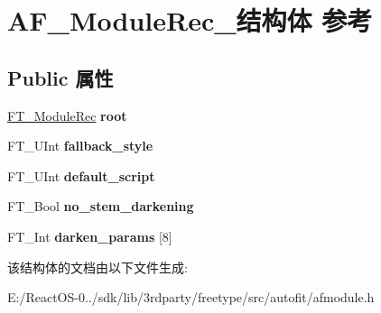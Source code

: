 \hypertarget{struct_a_f___module_rec__}{}\section{A\+F\+\_\+\+Module\+Rec\+\_\+结构体 参考}
\label{struct_a_f___module_rec__}
\subsection*{Public 属性}
\begin{DoxyCompactItemize}
\item 
\mbox{\label{struct_a_f___module_rec___a8e8fd4738d1c42e0610fac336bbc6d73}} 
\hyperlink{struct_f_t___module_rec__}{F\+T\+\_\+\+Module\+Rec} {\bfseries root}
\item 
\mbox{\label{struct_a_f___module_rec___a6960fca0f50a7d1ff28cb17d2be8aa66}} 
F\+T\+\_\+\+U\+Int {\bfseries fallback\+\_\+style}
\item 
\mbox{\label{struct_a_f___module_rec___a49c8dee7a9ef1ccd9f608028efab3ddc}} 
F\+T\+\_\+\+U\+Int {\bfseries default\+\_\+script}
\item 
\mbox{\label{struct_a_f___module_rec___ad6d5e179e222b6d4cb91038da82081b0}} 
F\+T\+\_\+\+Bool {\bfseries no\+\_\+stem\+\_\+darkening}
\item 
\mbox{\label{struct_a_f___module_rec___a1715bfa58ceddfc74a90b92c8e156659}} 
F\+T\+\_\+\+Int {\bfseries darken\+\_\+params} \mbox{[}8\mbox{]}
\end{DoxyCompactItemize}


该结构体的文档由以下文件生成\+:\begin{DoxyCompactItemize}
\item 
E\+:/\+React\+O\+S-\/0../sdk/lib/3rdparty/freetype/src/autofit/afmodule.\+h\end{DoxyCompactItemize}
